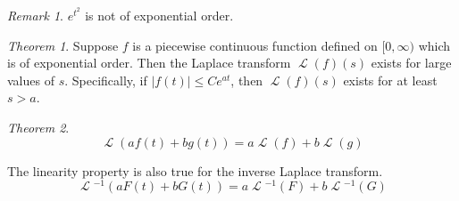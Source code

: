 \documentclass[a4paper]{article}
\DeclareMathOperator{\Lapl}{\mathcal{L}}
\theoremstyle{remark}
\newtheorem*{remark}{Remark}
\theoremstyle{theorem}
\newtheorem{theorem}{Theorem}
\begin{document}
\begin{remark}
	$e^{t^2}$ is not of exponential order.
\end{remark}

\begin{theorem}
Suppose $f$ is a piecewise continuous function defined on $[0,\infty)$ which is of exponential order.
Then the Laplace transform $\Lapl{(f)(s)}$ exists for large values of $s$.
Specifically, if $|f(t)| \leq Ce^{at}$, then $\Lapl{(f)(s)}$ exists for at least $s>a$.
\end{theorem}

\begin{theorem}
	\begin{equation}
		\Lapl{(af(t) + bg(t))} = a\Lapl{(f)} + b\Lapl{(g)}
	\end{equation}

	The linearity property is also true for the inverse Laplace transform.
	\begin{equation}
		\Lapl{^{-1}(aF(t) + bG(t))} = a\Lapl{^{-1}(F)} + b\Lapl{^{-1}(G)}
	\end{equation}
\end{theorem}
\end{document}
